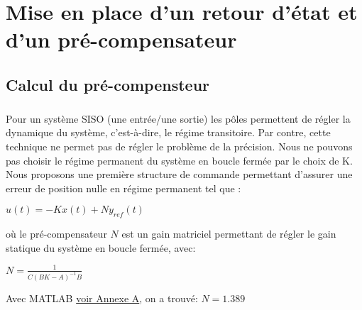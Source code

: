 \chapter{Mise en place d'un retour d'état et d'un pré-compensateur}
	
	\section{Calcul du pré-compensteur}

	\paragraph{}
	Pour un système SISO (une entrée/une sortie) les pôles permettent de régler la dynamique du système, c’est-à-dire, le régime transitoire. Par contre, cette technique ne permet pas de régler le problème de la précision. Nous ne pouvons pas choisir le régime permanent du système en boucle fermée par le choix de K. Nous proposons une première structure de commande permettant d’assurer une erreur de position nulle en régime permanent tel que \cite{ref1} :
	
	\begin{center}
	$u(t) = -Kx(t) + Ny_{ref}(t)$ 
	\end{center}		

	où le pré-compensateur $N$ est un gain matriciel permettant de régler le gain statique du système en boucle fermée, avec:
	
	\begin{center}
	$N = \frac{1}{C(BK-A)^{-1}B}$ 
	\end{center}	
	Avec MATLAB\label{section 3.3} \hyperref[Annexe A]{voir Annexe A}, on a trouvé: $N= 1.389$
	